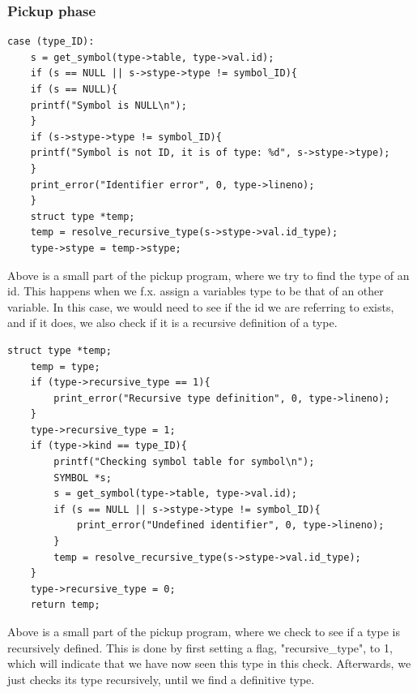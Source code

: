 \documentclass[a4paper,10pt,titlepage]{report}
\begin{document}
\subsubsection{Pickup phase}
\begin{lstlisting}
case (type_ID):
    s = get_symbol(type->table, type->val.id);
    if (s == NULL || s->stype->type != symbol_ID){
	if (s == NULL){
    printf("Symbol is NULL\n");
    }
    if (s->stype->type != symbol_ID){
    printf("Symbol is not ID, it is of type: %d", s->stype->type);
    }
    print_error("Identifier error", 0, type->lineno);
    }
    struct type *temp;
    temp = resolve_recursive_type(s->stype->val.id_type);
    type->stype = temp->stype;
\end{lstlisting}
Above is a small part of the pickup program, where we try to find the type of an id. This happens when we f.x. assign a variables type to be that of an other variable. In this case, we would need to see if the id we are referring to exists, and if it does, we also check if it is a recursive definition of a type.
\begin{lstlisting}
struct type *temp;
    temp = type;
	if (type->recursive_type == 1){
        print_error("Recursive type definition", 0, type->lineno);
    }
    type->recursive_type = 1;
    if (type->kind == type_ID){
        printf("Checking symbol table for symbol\n");
        SYMBOL *s;
        s = get_symbol(type->table, type->val.id);
        if (s == NULL || s->stype->type != symbol_ID){
            print_error("Undefined identifier", 0, type->lineno);
        }
        temp = resolve_recursive_type(s->stype->val.id_type);
    }
    type->recursive_type = 0;
    return temp;
\end{lstlisting}
Above is a small part of the pickup program, where we check to see if a type is recursively defined. This is done by first setting a flag, "recursive\_type", to 1, which will indicate that we have now seen this type in this check. Afterwards, we just checks its type recursively, until we find a definitive type.
\end{document}
